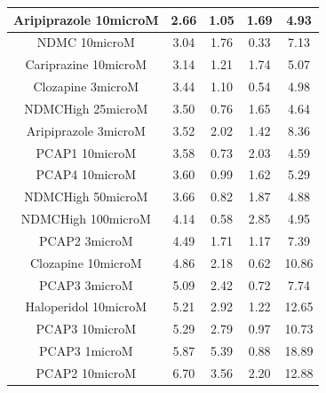 \documentclass[a4paper,12pt]{article}
\begin{document}
\begin{table}[h!]
\begin{tabular}{|c|c|c|c|c|}
Aripiprazole 10microM & 2.66 & 1.05 & 1.69 & 4.93  \\ \hline
NDMC 10microM         & 3.04 & 1.76 & 0.33 & 7.13  \\ \hline
Cariprazine 10microM  & 3.14 & 1.21 & 1.74 & 5.07  \\ \hline
Clozapine 3microM     & 3.44 & 1.10  & 0.54 & 4.98  \\ \hline
NDMCHigh 25microM     & 3.50  & 0.76 & 1.65 & 4.64  \\ \hline
Aripiprazole 3microM  & 3.52 & 2.02 & 1.42 & 8.36  \\ \hline
PCAP1 10microM        & 3.58 & 0.73 & 2.03 & 4.59  \\ \hline
PCAP4 10microM      & 3.60  & 0.99 & 1.62 & 5.29  \\ \hline
NDMCHigh 50microM     & 3.66 & 0.82 & 1.87 & 4.88  \\ \hline
NDMCHigh 100microM    & 4.14 & 0.58 & 2.85 & 4.95  \\ \hline
PCAP2 3microM         & 4.49 & 1.71 & 1.17 & 7.39  \\ \hline
Clozapine 10microM    & 4.86 & 2.18 & 0.62 & 10.86 \\ \hline
PCAP3 3microM       & 5.09 & 2.42 & 0.72 & 7.74  \\ \hline
Haloperidol 10microM  & 5.21 & 2.92 & 1.22 & 12.65 \\ \hline
PCAP3 10microM      & 5.29 & 2.79 & 0.97 & 10.73 \\ \hline
PCAP3 1microM       & 5.87 & 5.39 & 0.88 & 18.89 \\ \hline
PCAP2 10microM        & 6.70  & 3.56 & 2.20  & 12.88 \\ \hline
\end{tabular}
\end{table}
\newpage
\end{document}
